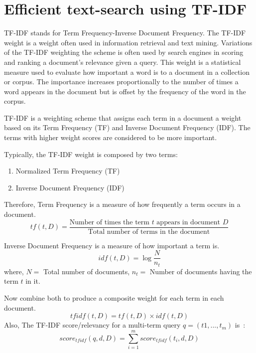 \section{Efficient text-search using TF-IDF}

TF-IDF stands for Term Frequency-Inverse Document Frequency. 
The TF-IDF weight is a weight often used in information 
retrieval and text mining. Variations of the TF-IDF weighting 
the scheme is often used by search engines in scoring and ranking 
a document’s relevance given a query. 
This weight is a statistical measure used to evaluate how 
important a word is to a document in a collection or corpus. 
The importance increases proportionally to the number of times 
a word appears in the document but is offset by the frequency 
of the word in the corpus.

TF-IDF is a weighting scheme that assigns each term in a 
document a weight based on its Term Frequency (TF) and 
Inverse Document Frequency (IDF). The terms with higher weight scores are considered to be more important.

Typically, the TF-IDF weight is composed by two terms:
\begin{enumerate}
    \item Normalized Term Frequency (TF)
    \item Inverse Document Frequency (IDF)
\end{enumerate}

Therefore, Term Frequency is a measure of how frequently a 
term occurs in a document.
\begin{equation}
    tf(t, D) = \frac{\text{Number of times the term } t \text{ appears in document } D}{\text{Total number of terms in the document}}
    \label{eqn:tf}
\end{equation}

Inverse Document Frequency is a measure of how important a term is.~\cite{tfidftutorial}
\begin{equation}
    idf(t, D) = \log \frac{N}{n _t}
    \label{eqn:idf}
\end{equation}
where, $N =$ Total number of documents, $n _t =$ Number of documents having the term $t$ in it.

Now combine both to produce a composite weight for each term in each document.
\begin{equation}
    tfidf(t,D) = tf(t,D) \times idf(t,D)
    \label{eqn:tfidf}
\end{equation}
Also, The TF-IDF score/relevancy for a multi-term query $q = (t 1 , . . . , t_m)$ is~\cite{tfidfFormulae}:
\begin{equation}
    score _{tfidf}(q, d, D) = \sum^{m}_{i = 1} score _{tfidf}(t _i, d, D)
    \label{eqn:score}
\end{equation}

